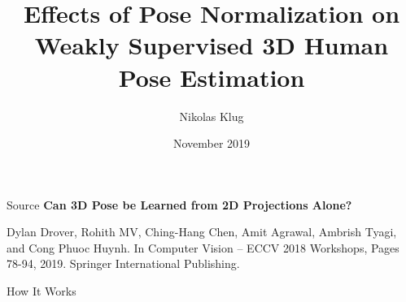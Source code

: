 \documentclass[8pt]{beamer}
\title[]{Effects of Pose Normalization on\\ Weakly Supervised 3D Human Pose Estimation}
\author[Nikolas Klug]{Nikolas Klug}
\institute[University of Augsburg]{University of Augsburg}
\date{\nth{6} November 2019}
\begin{document}
	{
	\begin{frame}
		\titlepage
	\end{frame}
	}
	\addtocounter{framenumber}{-1}

	\begin{frame}{Source}
		\textbf{Can 3D Pose be Learned from 2D Projections Alone?}\linebreak
		\begin{footnotesize}
			Dylan Drover, Rohith MV, Ching-Hang Chen, Amit Agrawal, Ambrish Tyagi, and Cong Phuoc Huynh.\linebreak
			In Computer Vision -- ECCV 2018 Workshops, Pages 78-94, 2019. Springer International Publishing.
		\end{footnotesize}
	\end{frame}


	\begin{frame}{How It Works}
		\begin{figure}
			\centering
		\end{figure}
	\end{frame}
\end{document}
